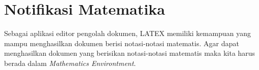 \section{Notifikasi Matematika}
Sebagai aplikasi editor pengolah dokumen, LATEX memiliki kemampuan yang mampu menghasilkan dokumen berisi notasi-notasi matematis. Agar dapat menghasilkan dokumen yang berisikan notasi-notasi matematis maka kita harus berada dalam \textit{Mathematics Environtment}.
